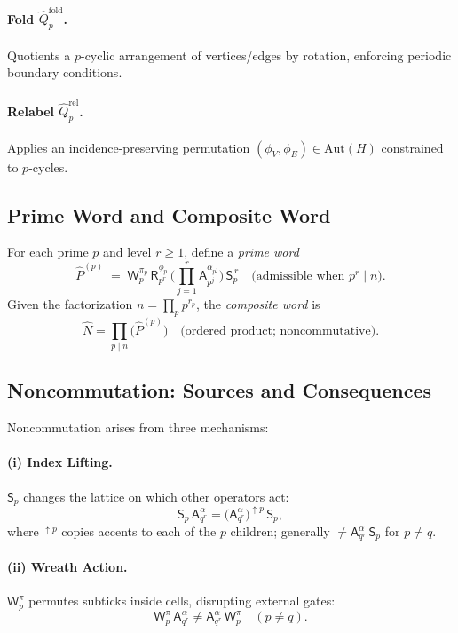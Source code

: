\documentclass[12pt]{article}
\numberwithin{equation}{section}
\theoremstyle{plain}
\theoremstyle{definition}
\theoremstyle{remark}
\begin{document}
\paragraph{Fold \(\hat{Q}_p^{\mathrm{fold}}\).}
Quotients a \(p\)-cyclic arrangement of vertices/edges by rotation, enforcing periodic boundary conditions.

\paragraph{Relabel \(\hat{Q}_p^{\mathrm{rel}}\).}
Applies an incidence-preserving permutation \((\phi_V,\phi_E)\in\mathrm{Aut}(H)\) constrained to \(p\)-cycles.

\subsection*{Prime Word and Composite Word}
For each prime \(p\) and level \(r\ge 1\), define a \emph{prime word}
\[
\hat{P}^{(p)}\;=\;\mathsf{W}_p^{\pi_p}\,\mathsf{R}_{p^r}^{\phi_p}\,\Big(\prod_{j=1}^{r}\mathsf{A}_{p^j}^{\alpha_{p^j}}\Big)\,\mathsf{S}_p^{\,r}
\quad\text{(admissible when }p^r\mid n\text{)}.
\]
Given the factorization \(n=\prod_{p} p^{r_p}\), the \emph{composite word} is
\[
\widehat{N}=\prod_{p\mid n}\big(\hat{P}^{(p)}\big) \quad \text{(ordered product; noncommutative).}
\]

\subsection*{Noncommutation: Sources and Consequences}
Noncommutation arises from three mechanisms:

\paragraph{(i) Index Lifting.}
\(\mathsf{S}_p\) changes the lattice on which other operators act:
\[
\mathsf{S}_p\,\mathsf{A}_{q^r}^{\alpha}=\big(\mathsf{A}_{q^r}^{\alpha}\big)^{\uparrow p}\,\mathsf{S}_p,
\]
where \({}^{\uparrow p}\) copies accents to each of the \(p\) children; generally \(\neq \mathsf{A}_{q^r}^{\alpha}\,\mathsf{S}_p\) for \(p\neq q\).

\paragraph{(ii) Wreath Action.}
\(\mathsf{W}_p^{\pi}\) permutes subticks inside cells, disrupting external gates:
\[
\mathsf{W}_p^{\pi}\,\mathsf{A}_{q^r}^{\alpha}\neq \mathsf{A}_{q^r}^{\alpha}\,\mathsf{W}_p^{\pi}\quad (p\neq q).
\]
\end{document}
